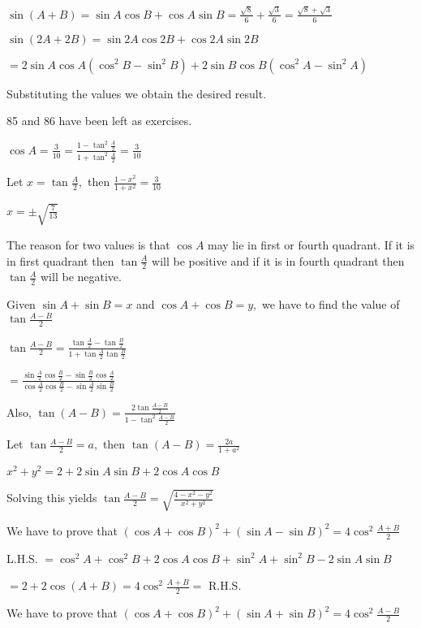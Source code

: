  $\sin(A + B) = \sin A\cos B + \cos A\sin B = \frac{\sqrt{8}}{6} + \frac{\sqrt{3}}{6} = \frac{\sqrt{8} + \sqrt{3}}{6}$

  $\sin(2A + 2B) = \sin 2A\cos 2B + \cos 2A\sin 2B$

  $= 2\sin A\cos A(\cos^2B - \sin^2B) + 2\sin B\cos B(\cos^2A - \sin^2A)$

  Substituting the values we obtain the desired result.

  85 and 86 have been left as exercises.

\item $\cos A = \frac{3}{10} = \frac{1 - \tan^2\frac{A}{2}}{1 + \tan^2\frac{A}{2}} = \frac{3}{10}$

  Let $x = \tan \frac{A}{2},$ then $\frac{1 - x^2}{1 + x^2} = \frac{3}{10}$

  $x = \pm \sqrt{\frac{7}{13}}$

  The reason for two values is that $\cos A$ may lie in first or fourth quadrant. If it is in first quadrant then
  $\tan \frac{A}{2}$ will be positive and if it is in fourth quadrant then $\tan \frac{A}{2}$ will be negative.

\item Given $\sin A + \sin B = x$ and $\cos A + \cos B = y,$ we have to find the value of $\tan \frac{A - B}{2}$

  $\tan \frac{A - B}{2} = \frac{\tan \frac{A}{2} - \tan \frac{B}{2}}{1 + \tan\frac{A}{2}\tan\frac{B}{2}}$

  $= \frac{\sin \frac{A}{2}\cos\frac{B}{2} - \sin\frac{B}{2}\cos\frac{A}{2}}{\cos\frac{A}{2}\cos\frac{B}{2} -
  \sin\frac{A}{2}\sin\frac{B}{2}}$

  Also, $\tan(A - B) = \frac{2\tan\frac{A - B}{2}}{1 - \tan^2\frac{A - B}{2}}$

  Let $\tan\frac{A - B}{2} = a,$ then $\tan(A - B) = \frac{2a}{1 + a^2}$

  $x^2 + y^2 = 2 + 2\sin A\sin B + 2\cos A\cos B$

  Solving this yields $\tan\frac{A - B}{2} = \sqrt{\frac{4 - x^2 - y^2}{x^2 + y^2}}$

\item We have to prove that $(\cos A + \cos B)^2 + (\sin A - \sin B)^2 = 4\cos^2 \frac{A + B}{2}$

  L.H.S. $= \cos^2A + \cos^2B + 2\cos A\cos B + \sin^2A + \sin^2B - 2\sin A\sin B$

  $= 2 + 2\cos(A + B) = 4\cos^2\frac{A + B}{2} =$ R.H.S.

\item We have to prove that $(\cos A + \cos B)^2 + (\sin A + \sin B)^2 = 4\cos^2 \frac{A - B}{2}$

